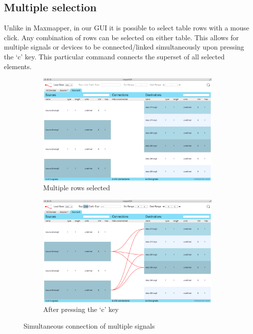 	\subsection{Multiple selection} %
	\label{sub:multiple_selection}

Unlike in Maxmapper, in our GUI it is possible to select table rows with a mouse click. Any combination of rows can be selected on either table. This allows for multiple signals or devices to be connected/linked simultaneously upon pressing the `c' key. This particular command connects the superset of all selected elements. 

\begin{figure}
	\centering
	\begin{subfigure}[]{0.49\textwidth}
		\centering
		\includegraphics[width=\textwidth]{figures/multi-select_before_connect}
		\caption{Multiple rows selected}
		\label{fig:multiple_connect_before}
	\end{subfigure}
	\begin{subfigure}[]{0.49\textwidth}
		\centering
		\includegraphics[width=\textwidth]{figures/multi-select_after_connect}
		\caption{After pressing the `c' key}
		\label{fig:multiple_connect_after}
	\end{subfigure}
	\caption{Simultaneous connection of multiple signals}\label{fig:multiple_connect}
\end{figure}

